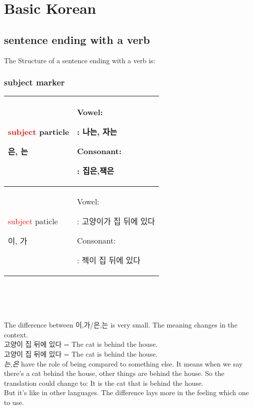 \section{Basic Korean}

\subsection{sentence ending with a verb}
The Structure of a sentence ending with a verb is: \\
\impbox{\textcolor{red}{Subject} - \textcolor{brown}{object} - \textcolor{blue}{verb}}

\subsubsection{subject marker}

\begin{tabular}{p{200pt}p{200pt}}
\hline
	 \textcolor{red}{subject} particle  	\begin{Korean} 은, 는\end{Korean}&
	
	Vowel:\begin{Korean} \red{는}: 나는, 자는 \end{Korean} 	\newline
	Consonant:\begin{Korean}\red{은}: 집은,잭은 \end{Korean}\\
	
\hline
	 \textcolor{red}{subject} paticle  	\begin{Korean} 이, 가\end{Korean}&
	
	Vowel:\begin{Korean} \red{가}: 고양이가 집 뒤에 있다 \end{Korean} 	\newline
	Consonant:\begin{Korean}\red{이}: 젝이 집 뒤에 있다 \end{Korean}\\
\hline
\end{tabular}\\
\\\\
\begin{Korean}The difference between 이,가/은,는 is very small. The meaning changes in the context. \\
고양이  집 뒤에 있다 = The cat is behind the house.\\
고양이  집 뒤에 있다 = The cat is behind the house.\\
\emph{는,은} have the role of being compared to something else. It means when we say there's a cat behind the house, other things are  behind the house. So the translation could change to: It is the cat that is behind the house.\\
But it's like in other languages. The difference lays more in the feeling which one to use.
\end{Korean}

